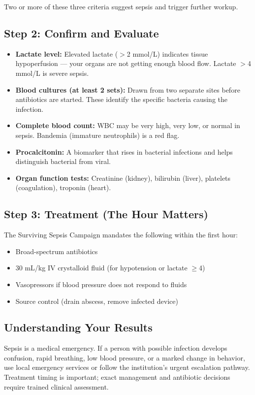 Two or more of these three criteria suggest sepsis and trigger further workup.

\subsection{Step 2: Confirm and Evaluate}

\begin{itemize}
    \item \textbf{Lactate level:} Elevated lactate ($>$2 mmol/L) indicates tissue hypoperfusion --- your organs are not getting enough blood flow. Lactate $>$4 mmol/L is severe sepsis.
    \item \textbf{Blood cultures (at least 2 sets):} Drawn from two separate sites before antibiotics are started. These identify the specific bacteria causing the infection.
    \item \textbf{Complete blood count:} WBC may be very high, very low, or normal in sepsis. Bandemia (immature neutrophils) is a red flag.
    \item \textbf{Procalcitonin:} A biomarker that rises in bacterial infections and helps distinguish bacterial from viral.
    \item \textbf{Organ function tests:} Creatinine (kidney), bilirubin (liver), platelets (coagulation), troponin (heart).
\end{itemize}

\subsection{Step 3: Treatment (The Hour Matters)}

The Surviving Sepsis Campaign mandates the following within the first hour:
\begin{itemize}
    \item Broad-spectrum antibiotics
    \item 30 mL/kg IV crystalloid fluid (for hypotension or lactate $\geq$4)
    \item Vasopressors if blood pressure does not respond to fluids
    \item Source control (drain abscess, remove infected device)
\end{itemize}

\subsection{Understanding Your Results}

Sepsis is a medical emergency. If a person with possible infection develops confusion, rapid breathing, low blood pressure, or a marked change in behavior, use local emergency services or follow the institution's urgent escalation pathway. Treatment timing is important; exact management and antibiotic decisions require trained clinical assessment.


